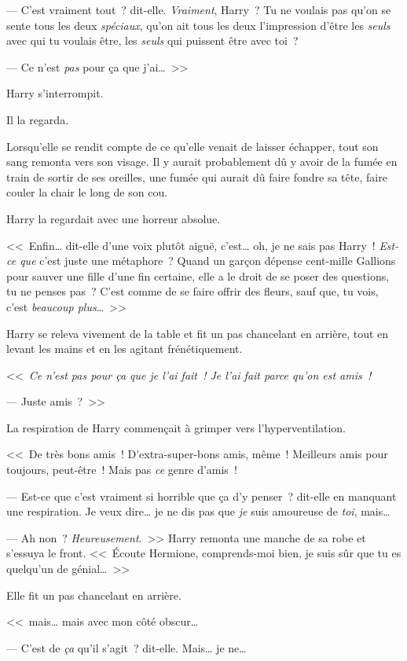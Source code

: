 --- C'est vraiment tout~? dit-elle. \emph{Vraiment}, Harry~? Tu ne voulais pas qu'on se sente tous les deux \emph{spéciaux}, qu'on ait tous les deux l'impression d'être les \emph{seuls} avec qui tu voulais être, les \emph{seuls} qui puissent être avec toi~?

--- Ce n'est \emph{pas} pour ça que j'ai…~>>

Harry s'interrompit.

Il la regarda.

Lorsqu'elle se rendit compte de ce qu'elle venait de laisser échapper, tout son sang remonta vers son visage. Il y aurait probablement dû y avoir de la fumée en train de sortir de ses oreilles, une fumée qui aurait dû faire fondre sa tête, faire couler la chair le long de son cou.

Harry la regardait avec une horreur absolue.

<<~Enfin… dit-elle d'une voix plutôt aiguë, c'est… oh, je ne sais pas Harry~! \emph{Est-ce que} c'est juste une métaphore~? Quand un garçon dépense cent-mille Gallions pour sauver une fille d'une fin certaine, elle a le droit de se poser des questions, tu ne penses pas~? C'est comme de se faire offrir des fleurs, sauf que, tu vois, c'est \emph{beaucoup plus}…~>>

Harry se releva vivement de la table et fit un pas chancelant en arrière, tout en levant les mains et en les agitant frénétiquement.

<<~\emph{Ce n'est pas pour ça que je l'ai fait~! Je l'ai fait parce qu'on est amis~!}

--- Juste amis~?~>>

La respiration de Harry commençait à grimper vers l'hyperventilation.

<<~De très bons amis~! D'extra-super-bons amis, même~! Meilleurs amis pour toujours, peut-être~! Mais pas \emph{ce} genre d'amis~!

--- Est-ce que c'est vraiment si horrible que ça d'y penser~? dit-elle en manquant une respiration. Je veux dire… je ne dis pas que \emph{je} suis amoureuse de \emph{toi}, mais…

--- Ah non~? \emph{Heureusement}.~>> Harry remonta une manche de sa robe et s'essuya le front. <<~Écoute Hermione, comprends-moi bien, je suis sûr que tu es quelqu'un de génial…~>>

Elle fit un pas chancelant en arrière.

<<~mais… mais avec mon côté obscur…

--- C'est de \emph{ça} qu'il s'agit~? dit-elle. Mais… je ne…

